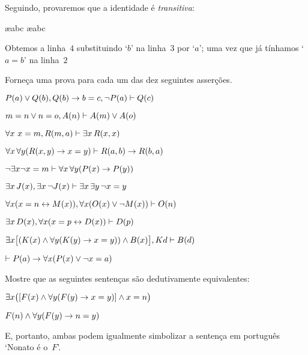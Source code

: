Seguindo, provaremos que a identidade \'e  \emph{transitiva}:
\begin{fitchproof}
	\open
		\ae{abc}
		\ae{abc}
	\close
\end{fitchproof}
Obtemos a linha~$4$ substituindo `$b$'  na linha~$3$ por `$a$'; uma vez que j\'a t\'inhamos  `$a= b$' na  linha~$2$

\practiceproblems
\problempart
\label{pr.identity}
Forne\c ca uma prova para cada um das dez seguintes asser\c c\~oes.
   
\begin{earg}
\item $\mathord{P}(a) \vee \mathord{Q}(b), \mathord{Q}(b) \rightarrow b=c, \neg\mathord{P}(a) \vdash \mathord{Q}(c)$
\item $m=n \vee n=o, \mathord{A}(n) \vdash \mathord{A}(m) \vee \mathord{A}(o)$
\item $\forall x\ x=m, \mathord{R}(m,a) \vdash \exists x\,\mathord{R}(x,x)$
\item $\forall x\,\forall y(\mathord{R}(x,y) \rightarrow x=y)\vdash \mathord{R}(a,b) \rightarrow \mathord{R}(b,a)$
\item $\neg \exists x\neg x = m \vdash \forall x\,\forall y (\mathord{P}(x) \rightarrow \mathord{P}(y))$
\item $\exists x\,\mathord{J}(x), \exists x\, \neg\mathord{J}(x)\vdash \exists x\, \exists y\, \neg x = y$
\item $\forall x(x=n \leftrightarrow \mathord{M}(x)), \forall x(\mathord{O}(x) \vee \neg \mathord{M}(x))\vdash \mathord{O}(n)$
\item $\exists x\,\mathord{D}(x), \forall x(x=p \leftrightarrow \mathord{D}(x))\vdash \mathord{D}(p)$
\item $\exists x\bigl[(\mathord{K}(x) \wedge \forall y(\mathord{K}(y) \rightarrow x=y)) \wedge \mathord{B}(x)\bigr], Kd\vdash \mathord{B}(d)$
\item $\vdash \mathord{P}(a) \rightarrow \forall x(\mathord{P}(x) \vee \neg x = a)$
\end{earg}

\problempart
Mostre que as seguintes senten\c cas s\~ao dedutivamente equivalentes:
\begin{ebullet}
\item $\exists x \bigl([\mathord{F}(x) \wedge \forall y (\mathord{F}(y) \rightarrow x = y)] \wedge x = n\bigr)$
\item $\mathord{F}(n) \wedge \forall y (\mathord{F}(y) \rightarrow n= y)$
\end{ebullet}
E, portanto, ambas podem igualmente simbolizar a senten\c ca em portugu\^es `Nonato \'e o~$F$'.\\

